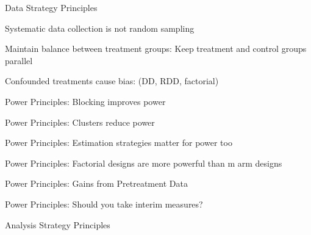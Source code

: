 \documentclass[11pt]{article}
\begin{document}
\begin{legal}
\begin{legal}
		\item Data Strategy Principles 

		\begin{legal}				
		\item	Systematic data collection is not random sampling
		\item	Maintain balance between treatment groups: Keep treatment and control groups parallel
		\item	Confounded treatments cause bias: (DD, RDD, factorial)
		\item	Power Principles: Blocking improves power
		\item	Power Principles: Clusters reduce power
		\item	Power Principles: Estimation strategies matter for power too
		\item	Power Principles:  Factorial designs are more powerful than m arm designs
		\item	Power Principles:  Gains from Pretreatment Data
		\item	Power Principles:  Should you take interim measures? 
		\end{legal}
		
    \item Analysis Strategy Principles 
		

\end{legal}
\end{legal}
\end{document}

